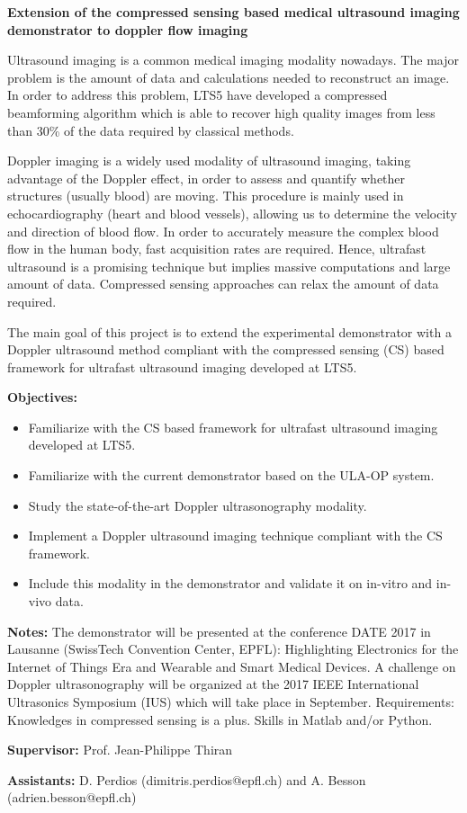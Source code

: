 \documentclass{article}
\begin{document}
\textbf{Extension of the compressed sensing based medical ultrasound imaging demonstrator to doppler flow imaging}

\vspace{\baselineskip}
\par Ultrasound imaging is a common medical imaging modality nowadays. The major problem is the amount of data and calculations needed to reconstruct an image. In order to address this problem, LTS5 have developed a compressed beamforming algorithm which is able to recover high quality images from less than 30\% of the data required by classical methods.
\par Doppler imaging is a widely used modality of ultrasound imaging, taking advantage of the Doppler effect, in order to assess and quantify whether structures (usually blood) are moving. This procedure is mainly used in echocardiography (heart and blood vessels), allowing us to determine the velocity and direction of blood flow. In order to accurately measure the complex blood flow in the human body, fast acquisition rates are required. Hence, ultrafast ultrasound is a promising technique but implies massive computations and large amount of data. Compressed sensing approaches can relax the amount of data required.

\vspace{\baselineskip}
The main goal of this project is to extend the experimental demonstrator with a Doppler ultrasound method compliant with the compressed sensing (CS) based framework for ultrafast ultrasound imaging developed at LTS5.

\vspace{\baselineskip} 
\textbf{Objectives:}
\begin{itemize}
	\item Familiarize with the CS based framework for ultrafast ultrasound imaging developed at LTS5.
	\item Familiarize with the current demonstrator based on the ULA-OP system.
	\item Study the state-of-the-art Doppler ultrasonography modality.
	\item Implement a Doppler ultrasound imaging technique compliant with the CS framework.
	\item Include this modality in the demonstrator and validate it on in-vitro and in-vivo data.
\end{itemize}

\textbf{Notes:} The demonstrator will be presented at the conference DATE 2017 in Lausanne (SwissTech Convention Center, EPFL): Highlighting Electronics for the Internet of Things Era and Wearable and Smart Medical Devices.
A challenge on Doppler ultrasonography will be organized at the 2017 IEEE International Ultrasonics Symposium (IUS) which will take place in September.
Requirements: Knowledges in compressed sensing is a plus. Skills in Matlab and/or Python.

\textbf{Supervisor:} Prof. Jean-Philippe Thiran

\textbf{Assistants:} D. Perdios (dimitris.perdios@epfl.ch) and A. Besson (adrien.besson@epfl.ch)
\end{document}
